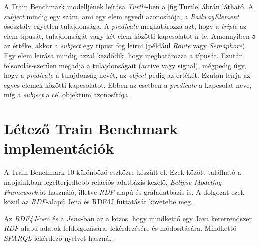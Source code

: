 A Train Benchmark modelljének leírása \emph{Turtle}-ben a \ref{fig:Turtle} ábrán látható. A \emph{subject} mindig egy szám, ami egy elem egyedi azonosítója, a \emph{RailwayElement} ősosztály egyetlen tulajdonsága. A \emph{predicate} meghatározza azt, hogy a \emph{triple} az elem típusát, tulajdonságát vagy két elem közötti kapcsolatot ír le. Amennyiben \texttt{a} az értéke, akkor a \emph{subject} egy típust fog leírni (például \emph{Route} vagy \emph{Semaphore}). Egy elem leírása mindig azzal kezdődik, hogy meghatározza a típusát. Ezután felsorolás-szerűen megadja a tulajdonságait (active vagy signal), mégpedig úgy, hogy a \emph{predicate} a tulajdonság nevét, az \emph{object} pedig az értékét. Ezután leírja az egyes elemek közötti kapcsolatot. Ebben az esetben a \emph{predicate} a kapcsolat neve, míg a \emph{subject} a cél objektum azonosítója. 



\section{Létező Train Benchmark implementációk}

A Train Benchmark 10 különböző eszközre készült el. Ezek között található a napjainkban legelterjedtebb relációs adatbázis-kezelő\cite{DBEnginesRanking}, \emph{Eclipse Modeling Framework}\cite{EMF}-öt használó, illetve \emph{RDF}-alapú és gráfadatbázis is. A dolgozat ezek közül az \emph{RDF}-alapú Jena\cite{Jena} és  RDF4J\cite{RDF4J} futtatását követelte meg.

Az \emph{RDF4J}-ben és a \emph{Jena}-ban az a közös, hogy mindkettő egy Java keretrendszer \emph{RDF} alapú adatok feldolgozására, lekérdezésére és módosítására. Mindkettő \emph{SPARQL} lekérdező nyelvet használ.